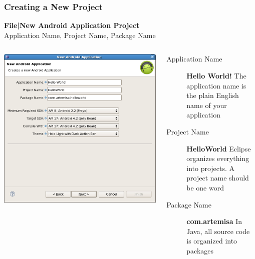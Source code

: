 \begin{frame}
\frametitle{Creating a New Project}
\textbf{File|New Android Application Project}\\
\alert{Application Name}, \alert{Project Name}, \alert{Package Name}

\begin{columns}
\centering
\includegraphics[width= 1.0 \textwidth]{NewAndroidApplication1.eps}
\begin{description}
 	\item[Application Name] \textbf{Hello World!} The application name is the plain English name of your application
	\item[Project Name] \textbf{HelloWorld} Eclipse organizes everything into projects. A project name should be one word
	\item[Package Name] \textbf{com.artemisa} In Java, all source code is organized into packages
\end{description}
\end{columns}
\end{frame}
